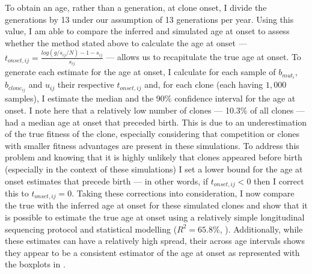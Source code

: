 \begin{figure}[h]
	\label{fig:explained-traj-sim}
\end{figure}

To obtain an age, rather than a generation, at clone onset, I divide the generations by 13 under our assumption of 13 generations per year. Using this value, I am able to compare the inferred and simulated age at onset to assess whether the method stated above to calculate the age at onset --- $t_{onset,ij} = \frac{log(g/s_{ij}/N)-1-s_{ij}}{s_{ij}}$ --- allows us to recapitulate the true age at onset. To generate each estimate for the age at onset, I calculate for each sample of $b_{mut_i}$, $b_{clone_{ij}}$ and $u_{ij}$ their respective $t_{onset,ij}$ and, for each clone (each having $1,000$ samples), I estimate the median and the 90\% confidence interval for the age at onset. I note here that a relatively low number of clones --- 10.3\% of all clones --- had a median age at onset that preceded birth. This is due to an underestimation of the true fitness of the clone, especially considering that competition or clones with smaller fitness advantages are present in these simulations. To address this problem and knowing that it is highly unlikely that clones appeared before birth (especially in the context of these simulations) I set a lower bound for the age at onset estimates that precede birth --- in other words, if $t_{onset,ij} < 0$ then I correct this to $t_{onset,ij}=0$. Taking these corrections into consideration, I now compare the true with the inferred age at onset for these simulated clones and show that it is possible to estimate the true age at onset using a relatively simple longitudinal sequencing protocol and statistical modelling ($R^2 = 65.8\%$, ). Additionally, while these estimates can have a relatively high spread, their across age intervals shows they appear to be a consistent estimator of the age at onset as represented with the boxplots in . 

\begin{figure}[h]
	\label{fig:age-at-onset-sim}
\end{figure}


